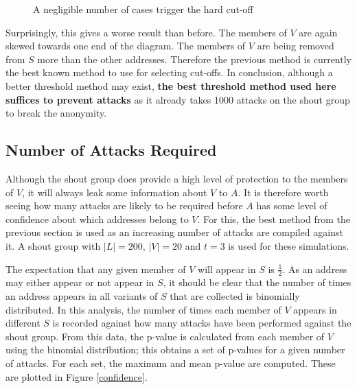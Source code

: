 \documentclass[ %
                    author={Luke Murray},
                supervisor={Dr. Simon Hollis},
                     title={Shadow Peer-to-Peer Networks},
                  subtitle={},
                    degree={MEng},
                      year={2013} ]{thesis}
\begin{document}
\begin{figure}[h]
\begin{minipage}[b]{0.45\linewidth}
        \caption{A negligible number of cases trigger the hard cut-off}
        \label{threshold_attack_dynamic2}
    \end{minipage}
\end{figure}

Surprisingly, this gives a worse result than before. The members of $V$ are again skewed towards one end of the diagram. The members of $V$ are being removed from $S$ more than the other addresses. Therefore the previous method is currently the best known method to use for selecting cut-offs. In conclusion, although a better threshold method may exist, \textbf{the best threshold method used here suffices to prevent attacks} as it already takes 1000 attacks on the shout group to break the anonymity.

\subsection{Number of Attacks Required}

Although the shout group does provide a high level of protection to the members of $V$, it will always leak some information about $V$ to $A$. It is therefore worth seeing how many attacks are likely to be required before $A$ has some level of confidence about which addresses belong to $V$. For this, the best method from the previous section is used as an increasing number of attacks are compiled against it. A shout group with $|L| = 200$, $|V| = 20$ and $t = 3$ is used for these simulations.

The expectation that any given member of $V$ will appear in $S$ is $\frac{1}{2}$. As an address may either appear or not appear in $S$, it should be clear that the number of times an address appears in all variants of $S$ that are collected is binomially distributed. In this analysis, the number of times each member of $V$ appears in different $S$ is recorded against how many attacks have been performed against the shout group. From this data, the p-value is calculated from each member of $V$ using the binomial distribution; this obtains a set of p-values for a given number of attacks. For each set, the maximum and mean p-value are computed. These are plotted in Figure \ref{confidence}.
\end{document}
